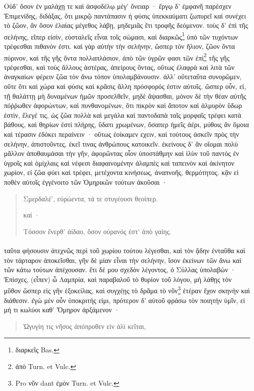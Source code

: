 \documentclass[a4paper, 11pt, oneside, polutonikogreek, german]{article}
\begin{document}
Οὐδ' ὅσον ἐν μαλάχῃ τε καὶ ἀσφοδέλῳ μέγ' ὄνειαρ · ἔργῳ δ' ἐμφανῆ παρέσχεν Ἐπιμενίδης, διδάξας, ὅτι μικρῷ παντάπασιν ἡ φύσις ὑπεκκαύματι ζωπυρεῖ καὶ συνέχει τὸ ζῶον, ἂν ὅσον ἐλαίας μέγεθος λάβῃ, μηδεμιᾶς ἔτι τροφῆς δεόμενον. τοὺς δ' ἐπὶ τῆς σελήνης, εἴπερ εἰσὶν, εὐσταλεῖς εἶναι τοῖς σώμασι, καὶ διαρκῶς\footnote{διαρκεῖς Bas.} ὑπὸ τῶν τυχόντων τρέφεσθαι πιθανόν ἐστι. καὶ γὰρ αὐτὴν τὴν σελήνην, ὥσπερ τὸν ἥλιον, ζῶον ὄντα πύρινον, καὶ τῆς γῆς ὄντα πολλαπλάσιον, ἀπὸ τῶν ὑγρῶν φασι τῶν ἐπὶ\footnote{ἀπὸ Turn. et Vulc.} τῆς γῆς τρέφεσθαι, καὶ τοὺς ἄλλους ἀστέρας, ἀπείρους ὄντας, οὕτως ἐλαφρὰ καὶ λιτὰ τῶν ἀναγκαίων φέρειν ζῶα τὸν ἄνω τόπον ὑπολαμβάνουσιν. ἀλλ' οὔτεταῦτα συνορῶμεν, οὔτε ὅτι καὶ χώρα καὶ φύσις καὶ κρᾶσις ἄλλη πρόσφορός ἐστιν αὐτοῖς. ὥσπερ οὖν, εἰ, τῇ θαλάττῃ μὴ δυναμένων ἡμῶν προσελθεῖν, μηδὲ ἅψασθαι, μόνον δὲ τὴν θέαν αὐτῆς πόῤῥωθεν ἀφορώντων, καὶ πυνθανομένων, ὅτι πικρὸν καὶ ἄποτον καὶ ἁλμυρὸν ὕδωρ ἐστὶν, ἔλεγέ τις, ὡς ζῶα πολλὰ καὶ μεγάλα καὶ παντοδαπὰ ταῖς μορφαῖς τρέφει κατὰ βάθους, καὶ θηρίων ἐστὶ πλήρης, ὕδατι χρωμένων, ὅσαπερ ἡμεῖς ἀέρι, μύθοις ἂν ὅμοια καὶ τέρασιν ἐδόκει περαίνειν · οὕτως ἐοίκαμεν εχειν, καὶ τούτους ἀσκεῖν πρὸς τὴν σελήνην, ἀπιστοῦντες, ἐκεῖ τινας ἀνθρώπους κατοικεῖν. ἐκείνους δ' ἂν οἴομαι πολὺ μᾶλλον ἀποθαυμάσαι τὴν γῆν, ἀφορῶντας οἷον ὑποστάθμην καὶ ἰλὺν τοῦ παντὸς ἐν ὑγροῖς καὶ ὁμίχλαις καὶ νέφεσι διαφαινομένην ἀλαμπὲς καὶ ταπεινὸν καὶ ἀκίνητον χωρίον, εἰ ζῶα φύει καὶ τρέφει, μετέχοντα κινήσεως, ἀναπνοῆς, θερμότητος. κᾂν εἰ ποθὲν αὐτοῖς ἐγγένοιτο τῶν Ὁμηρικῶν τούτων ἀκοῦσαι ·
\begin{quotation}\small
Σμερδαλέ', εὐρώεντα, τά τε στυγέουσι θεοίπερ.

καί ·

Τόσσον ἔνερθ' ἀίδαο, ὅσον οὐρανός ἐστ' ἀπὸ γαίης.
\end{quotation}
\paragraph{}
ταῦτα φήσουσιν ἀτεχνῶς περὶ τοῦ χωρίου τούτου λέγεσθαι, καὶ τὸν ᾅδην ἐνταῦθα καὶ τὸν τάρταρον ἀποκεῖσθαι, γῆν δὲ μίαν εἶναι τὴν σελήνην, ἴσον ἐκείνων τῶν ἄνω καὶ τῶν κάτω τούτων ἀπέχουσαν. ἔτι δέ μου σχεδὸν λέγοντος, ὁ Σύλλας ὑπολαβών · Ἐπίσχες, (εἶπεν) ὦ Λαμπρία, καὶ παραβαλοῦ τὸ θυρίον τοῦ λόγου, μὴ λάθῃς τὸν μῦθον ὥσπερ εἰς γῆν ἐξοκείλας, καὶ συγχέῃς τὸ δρᾶμα τὸ νῦν\footnote{Pro νῦν dant ἐμὸν Turn. et Vulc.} ἑτέραν ἔχον σκηνὴν καὶ διάθεσιν. ἐγὼ μὲν οὖν ὑποκριτής εἰμι, πρότερον δ' αὐτοῦ φράσω τὸν ποιητὴν ὑμῖν, εἰ μή τι κωλύοι καθ' Ὅμηρον ἀρξάμενον ·
\begin{quotation}\small
Ὠγυγίη τις νῆσος ἀπόπροθεν εἰν ἁλὶ κεῖται,
\end{quotation}
\end{document}
